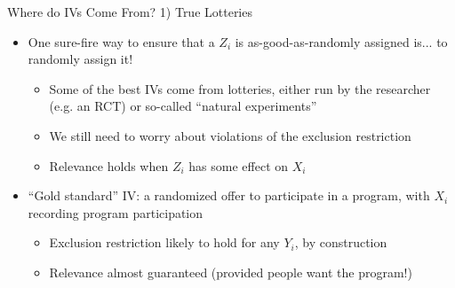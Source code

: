 \documentclass{beamer}
\begin{document}
\begin{frame}{Where do IVs Come From? 1) True Lotteries}
\begin{itemize}
\item One sure-fire way to ensure that a $Z_i$ is as-good-as-randomly assigned is... \pause{} to randomly assign it!\pause{}\smallskip
\begin{itemize}
\item Some of the best IVs come from lotteries, either run by the researcher (e.g. an RCT) or so-called ``natural experiments''
\smallskip
\item We still need to worry about violations of the exclusion restriction
\smallskip
\item Relevance holds when $Z_i$ has some effect on $X_i$
\end{itemize}\pause{}
\medskip

\item ``Gold standard'' IV: a randomized offer to participate in a program, with $X_i$ recording program participation\smallskip
\begin{itemize}
\item Exclusion restriction likely to hold for any $Y_i$, by construction
\smallskip
\item Relevance almost guaranteed (provided people want the program!)
\end{itemize}
\end{itemize}
\end{frame}
\end{document}

